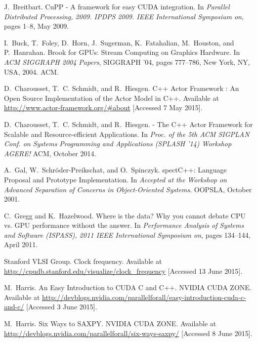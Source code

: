 \documentclass{sig-alternate-05-2015}
\begin{document}
\begin{thebibliography}{10}

J.~Breitbart.
\newblock Cu{PP} - {A} framework for easy {CUDA} integration.
\newblock In {\em Parallel Distributed Processing, 2009. IPDPS 2009. IEEE
  International Symposium on}, pages 1--8, May 2009.

I.~Buck, T.~Foley, D.~Horn, J.~Sugerman, K.~Fatahalian, M.~Houston, and
  P.~Hanrahan.
\newblock Brook for {GPU}s: {S}tream {C}omputing on {G}raphics {H}ardware.
\newblock In {\em ACM SIGGRAPH 2004 Papers}, SIGGRAPH '04, pages 777--786, New
  York, NY, USA, 2004. ACM.

D.~Charousset, T.~C. Schmidt, and R.~Hiesgen.
 {C}++ {A}ctor {F}ramework : {A}n {O}pen {S}ource
  {I}mplementation of the {A}ctor {M}odel in {C}++.
\newblock Available at \url{http://www.actor-framework.org/#about} [Accessed 7
  May 2015].

D.~Charousset, T.~C. Schmidt, and R.~Hiesgen.
 - {T}he {C}++ {A}ctor {F}ramework for {S}calable and
  {R}esource-efficient {A}pplications.
\newblock In {\em Proc. of the 5th ACM SIGPLAN Conf. on Systems Programming and
  Applications (SPLASH '14) Workshop AGERE!} ACM, October 2014.

A.~Gal, W.~Schr{\"{o}}der-Preikschat, and O.~Spinczyk.
spect{C}++: {L}anguage {P}roposal and {P}rototype
  {I}mplementation.
\newblock In {\em Accepted at the Workshop on Advanced Separation of Concerns
  in Object-Oriented Systems}. OOPSLA, October 2001.

C.~Gregg and K.~Hazelwood.
\newblock Where is the data? {W}hy you cannot debate {CPU} vs. {GPU}
  performance without the answer.
\newblock In {\em Performance Analysis of Systems and Software (ISPASS), 2011
  IEEE International Symposium on}, pages 134--144, April 2011.

Stanford VLSI Group.
\newblock Clock frequency.
\newblock Available at
  \url{http://cpudb.stanford.edu/visualize/clock_frequency} [Accessed 13 June
  2015].

M.~Harris.
\newblock An {E}asy {I}ntroduction to {CUDA} {C} and {C}++. {NVIDIA} {CUDA}
  {ZONE}.
\newblock Available at
  \url{http://devblogs.nvidia.com/parallelforall/easy-introduction-cuda-c-and-c/}
  [Accessed 3 June 2015].

M.~Harris.
\newblock Six {W}ays to {SAXPY}. {NVIDIA} {CUDA} {ZONE}.
\newblock Available at
  \url{http://devblogs.nvidia.com/parallelforall/six-ways-saxpy/} [Accessed 8
  June 2015].


\end{thebibliography}
\end{document}

